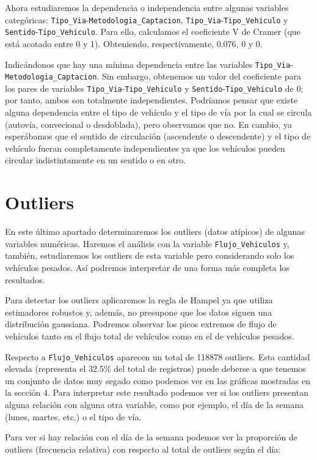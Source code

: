 \documentclass[notspecified,article,submit,moreauthors,pdftex]{Definitions/mdpi}
\begin{document}
Ahora estudiaremos la dependencia o independencia entre algunas
variables categóricas:
\texttt{Tipo\_Via}-\texttt{Metodologia\_Captacion},
\texttt{Tipo\_Via}-\texttt{Tipo\_Vehiculo} y
\texttt{Sentido}-\texttt{Tipo\_Vehiculo}. Para ello, calculamos el
coeficiente V de Cramer (que está acotado entre 0 y 1). Obteniendo,
respectivamente, 0.076, 0 y 0.

Indicándonos que hay una mínima dependencia entre las variables
\texttt{Tipo\_Via}-\texttt{Metodologia\_Captacion}. Sin embargo,
obtenemos un valor del coeficiente para los pares de variables
\texttt{Tipo\_Via}-\texttt{Tipo\_Vehiculo} y
\texttt{Sentido}-\texttt{Tipo\_Vehiculo} de 0; por tanto, ambos son
totalmente independientes. Podríamos pensar que existe alguna
dependencia entre el tipo de vehículo y el tipo de vía por la cual se
circula (autovía, convecional o desdoblada), pero observamos que no. En
cambio, ya esperábamos que el sentido de circulación (ascendente o
descendente) y el tipo de vehículo fueran completamente independientes
ya que los vehículos pueden circular indistintamente en un sentido o en
otro.

\section{Outliers}\label{outliers}

En este último apartado determinaremos los outliers (datos atípicos) de
algunas variables numéricas. Haremos el análisis con la variable
\texttt{Flujo\_Vehiculos} y, también, estudiaremos los outliers de esta
variable pero considerando solo los vehículos pesados. Así podremos
interpretar de una forma más completa los resultados.

Para detectar los outliers aplicaremos la regla de Hampel ya que utiliza
estimadores robustos y, además, no presupone que los datos siguen una
distribución gaussiana. Podremos observar los picos extremos de flujo de
vehículos tanto en el flujo total de vehículos como en el de vehículos
pesados.

Respecto a \texttt{Flujo\_Vehiculos} aparecen un total de 118878
outliers. Esta cantidad elevada (representa el 32.5\% del total de
registros) puede deberse a que tenemos un conjunto de datos muy segado
como podemos ver en las gráficas mostradas en la sección 4. Para
interpretar este resultado podemos ver si los outliers presentan alguna
relación con alguna otra variable, como por ejemplo, el día de la semana
(lunes, martes, etc.) o el tipo de vía.

Para ver si hay relación con el día de la semana podemos ver la
proporción de outliers (frecuencia relativa) con respecto al total de
outliers según el día:
\end{document}

